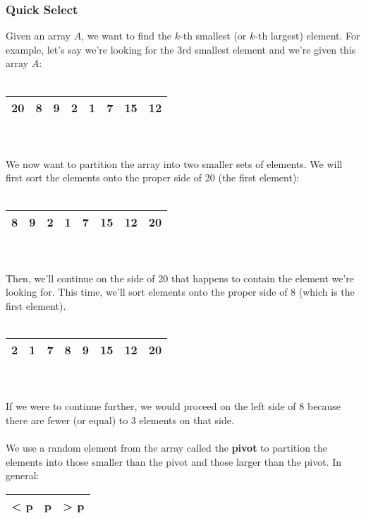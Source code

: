 \documentclass[]{article}
\theoremstyle{definition}
\begin{document}
			\subsubsection{Quick Select}
				Given an array $A$, we want to find the $k$-th smallest (or $k$-th largest) element. For example, let's say we're looking for the 3rd smallest element and we're given this array $A$: \\ \\
				\begin{tabular}{|c|c|c|c|c|c|c|c|}
					\hline 20 & 8 & 9 & 2 & 1 & 7 & 15 & 12 \\ \hline
				\end{tabular}
				\\ \\
				We now want to partition the array into two smaller sets of elements. We will first sort the elements onto the proper side of 20 (the first element):
				\\ \\
				\begin{tabular}{|c|c|c|c|c|c|c|c|}
					\hline 8 & 9 & 2 & 1 & 7 & 15 & 12 & 20 \\ \hline
				\end{tabular}
				\\ \\
				Then, we'll continue on the side of 20 that happens to contain the element we're looking for. This time, we'll sort elements onto the proper side of 8 (which is the first element).
				\\ \\
				\begin{tabular}{|c|c|c|c|c|c|c|c|}
					\hline 2 & 1 & 7 & 8 & 9 & 15 & 12 & 20 \\ \hline
				\end{tabular}
				\\ \\
				If we were to continue further, we would proceed on the left side of 8 because there are fewer (or equal) to 3 elements on that side.
				\\ \\
				We use a random element from the array called the \textbf{pivot} to partition the elements into those smaller than the pivot and those larger than the pivot. In general: 
				\begin{tabular}{|c|c|c|}
					\hline < p & p & > p \\ \hline
				\end{tabular}
				\\ \\
\end{document}
